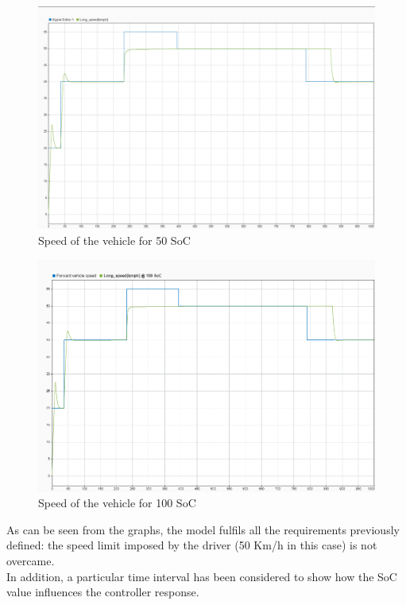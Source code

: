 \documentclass[12pt,a4paper]{report}
\begin{document}
\begin{figure}[htbp]
	\centering
	\includegraphics[scale=0.2]{50_soc.jpeg}
	\caption{Speed of the vehicle for 50 SoC}
\end{figure}

\begin{figure}[htbp]
	\centering
	\includegraphics[scale=0.4]{100_soc.png}
	\caption{Speed of the vehicle for 100 SoC}
\end{figure}
\FloatBarrier
As can be seen from the graphs, the model fulfils all the requirements previously defined: the speed limit imposed by the driver (50 Km/h in this case) is not overcame.\\
In addition, a particular time interval has been considered to show how the SoC value influences the controller response.\\
\FloatBarrier
\end{document}
